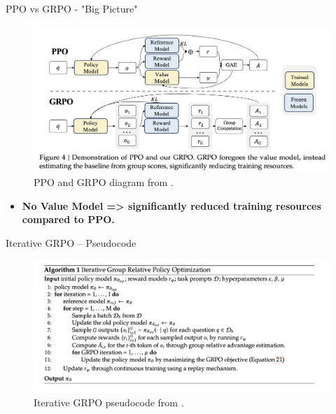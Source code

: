 \documentclass[9pt]{beamer}
\begin{document}
\begin{frame}{PPO vs GRPO - "Big Picture"}
  \begin{figure}
    \centering
    \includegraphics[width=1.0\textwidth]{figures/ppo_vs_grpo.png}
    \caption{PPO and GRPO diagram from \cite{shao2024deepseekmathpushinglimitsmathematical}.}
    \label{fig:trl2}
  \end{figure}

    \pause
  \begin{itemize}
  \item \textbf{No Value Model => significantly reduced training resources compared to PPO.}
\end{itemize}

\end{frame}


\begin{frame}{Iterative GRPO – Pseudocode}
  \begin{figure}
    \centering
    \includegraphics[width=1.0\textwidth]{figures/grpo_code.png}
    \caption{Iterative GRPO pseudocode from \cite{shao2024deepseekmathpushinglimitsmathematical}.}
    \label{fig:trl3}
  \end{figure}

\end{frame}
\end{document}
